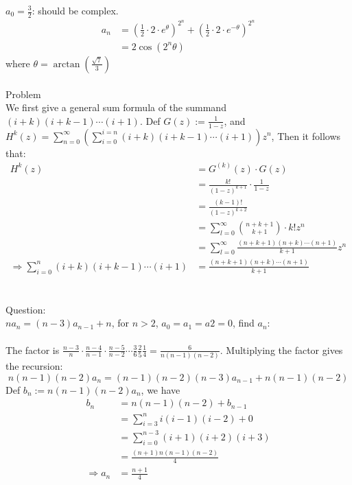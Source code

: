\documentclass{article}
\begin{document}
$a_0 = \frac{3}{2}$:
should be complex. 
\begin{align*}
	a_n &= (\frac{1}{2} \cdot 2 \cdot e^{\theta})^{2^n} + (\frac{1}{2} \cdot 2 \cdot e^{-\theta})^{2^n} \\
	&= 2\cos(2^n\theta)
\end{align*}
where $\theta = \arctan(\frac{\sqrt{7}}{3})$ \\\\


Problem \\
We first give a general sum formula of the summand $(i+k)(i+k-1)\cdots(i+1)$.
Def $G(z) := \frac{1}{1-z}$, and $H^{k}(z) = \sum_{n = 0}^{\infty} (\sum_{i = 0}^{i = n} (i+k)(i+k-1)\cdots(i+1)) z^n $, Then it follows that:
\begin{align*}
	H^{k}(z) &= G^{(k)}(z) \cdot G(z) \\
		&= \frac{k!}{(1-z)^{k+1}} \cdot \frac{1}{1-z}\\
		&= \frac{(k-1)!}{(1-z)^{k+2}}\\
		&= \sum_{l = 0}^{\infty} \binom{n + k + 1}{k+1} \cdot k! z^n\\
		&= \sum_{l = 0}^{\infty} \frac{(n+k+1)(n+k)\cdots(n+1)}{k+1} z^n \\
		\Rightarrow \sum_{i = 0}^{n} (i + k)(i+k-1)\cdots(i+1) &= \frac{(n+k+1)(n+k)\cdots(n+1)}{k+1}
\end{align*}\\\\

Question:\\
$na_n = (n-3)a_{n-1} + n$, for $n > 2$, $a_0 = a_1 = a2 = 0$, find $a_n$:\\\\
The factor is $\frac{n-3}{n} \cdot \frac{n-4}{n-1} \cdot \frac{n-5}{n-2}\cdots \frac{3}{6} \frac{2}{5} \frac{1}{4} = \frac{6}{n(n-1)(n-2)}$. Multiplying the factor gives the recursion:
\[
	n(n-1)(n-2)a_n = (n-1)(n-2)(n-3)a_{n-1} + n(n-1)(n-2)
\]
Def $b_n := n(n-1)(n-2)a_n$, we have 
\begin{align*}
	b_n &= n(n-1)(n-2) + b_{n-1} \\
		&= \sum_{i = 3}^n i(i-1)(i-2) + 0\\
		&= \sum_{i=0}^{n-3} (i+1)(i+2)(i+3) \\
		&= \frac{(n+1)n(n-1)(n-2)}{4} \\
		\Rightarrow a_n &= \frac{n+1}{4}
\end{align*}
\end{document}
